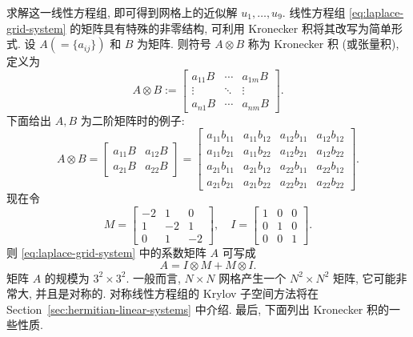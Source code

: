 {求解这一线性方程组, 即可得到网格上的近似解 $u_1,\ldots,u_9$.}
{线性方程组 \eqref{eq:laplace-grid-system} 的矩阵具有特殊的非零结构, 可利用 Kronecker 积将其改写为简单形式. 设 $A(=\{a_{ij}\})$ 和 $B$ 为矩阵. 则符号 $A\otimes B$ 称为 Kronecker 积 (或张量积), 定义为}
\begin{equation}\label{eq:kronecker-product-definition}
A\otimes B:=\begin{bmatrix}a_{11}B&\cdots&a_{1m}B\\\vdots&\ddots&\vdots\\a_{n1}B&\cdots&a_{nm}B\end{bmatrix}.
\end{equation}
{下面给出 $A,B$ 为二阶矩阵时的例子:}
\[A\otimes B=\left[\begin{array}{c|c}a_{11}B&a_{12}B\\\hline a_{21}B&a_{22}B\end{array}\right]
=\left[\begin{array}{cc|cc}
a_{11}b_{11}&a_{11}b_{12}&a_{12}b_{11}&a_{12}b_{12}\\
a_{11}b_{21}&a_{11}b_{22}&a_{12}b_{21}&a_{12}b_{22}\\\hline
a_{21}b_{11}&a_{21}b_{12}&a_{22}b_{11}&a_{22}b_{12}\\
a_{21}b_{21}&a_{21}b_{22}&a_{22}b_{21}&a_{22}b_{22}
\end{array}\right].\]
{现在令}
\[M=\begin{bmatrix}-2&1&0\\1&-2&1\\0&1&-2\end{bmatrix},\quad I=\begin{bmatrix}1&0&0\\0&1&0\\0&0&1\end{bmatrix}.\]
{则 \eqref{eq:laplace-grid-system} 中的系数矩阵 $A$ 可写成}
\begin{equation}\label{eq:laplace-kronecker-sum}
A=I\otimes M+M\otimes I.
\end{equation}
{矩阵 $A$ 的规模为 $3^2\times3^2$. 一般而言, $N\times N$ 网格产生一个 $N^2\times N^2$ 矩阵, 它可能非常大, 并且是对称的. 对称线性方程组的 Krylov 子空间方法将在 Section\ \ref{sec:hermitian-linear-systems} 中介绍. 最后, 下面列出 Kronecker 积的一些性质.}
